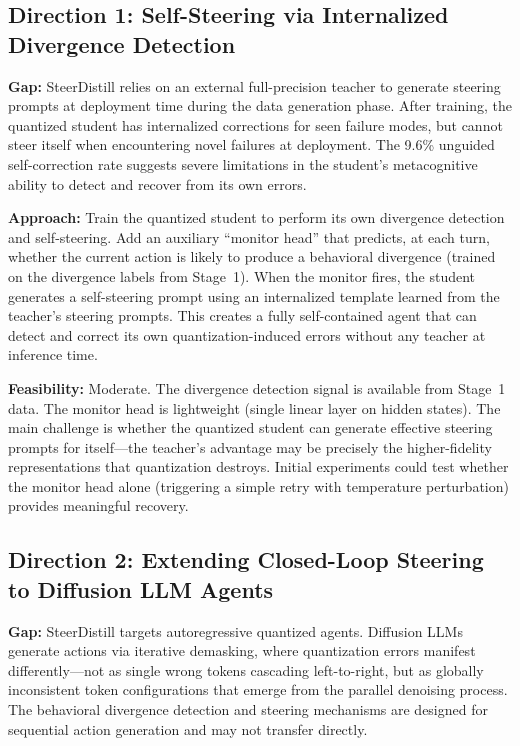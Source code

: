 \documentclass[11pt,a4paper]{article}
\begin{document}
\subsection{Direction 1: Self-Steering via Internalized Divergence Detection}
\textbf{Gap:} SteerDistill relies on an external full-precision teacher to generate steering prompts at deployment time during the data generation phase. After training, the quantized student has internalized corrections for seen failure modes, but cannot steer itself when encountering novel failures at deployment. The 9.6\% unguided self-correction rate suggests severe limitations in the student's metacognitive ability to detect and recover from its own errors.

\textbf{Approach:} Train the quantized student to perform its own divergence detection and self-steering. Add an auxiliary ``monitor head'' that predicts, at each turn, whether the current action is likely to produce a behavioral divergence (trained on the divergence labels from Stage~1). When the monitor fires, the student generates a self-steering prompt using an internalized template learned from the teacher's steering prompts. This creates a fully self-contained agent that can detect and correct its own quantization-induced errors without any teacher at inference time.

\textbf{Feasibility:} Moderate. The divergence detection signal is available from Stage~1 data. The monitor head is lightweight (single linear layer on hidden states). The main challenge is whether the quantized student can generate effective steering prompts for itself---the teacher's advantage may be precisely the higher-fidelity representations that quantization destroys. Initial experiments could test whether the monitor head alone (triggering a simple retry with temperature perturbation) provides meaningful recovery.

\subsection{Direction 2: Extending Closed-Loop Steering to Diffusion LLM Agents}
\textbf{Gap:} SteerDistill targets autoregressive quantized agents. Diffusion LLMs generate actions via iterative demasking, where quantization errors manifest differently---not as single wrong tokens cascading left-to-right, but as globally inconsistent token configurations that emerge from the parallel denoising process. The behavioral divergence detection and steering mechanisms are designed for sequential action generation and may not transfer directly.
\end{document}
